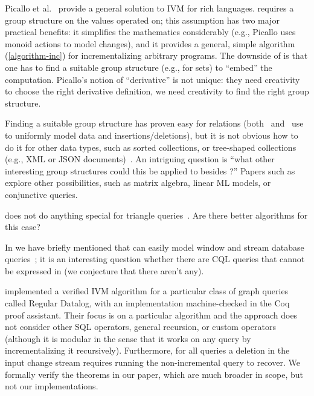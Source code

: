 Picallo et al.~\cite{picallo-scop19} provide a general solution to IVM for
rich languages.  \dbsp requires a group structure on the values operated on;
this assumption has two major practical benefits: it simplifies the mathematics considerably
(e.g., Picallo uses monoid actions to model changes), and it provides a general, simple
algorithm (\ref{algorithm-inc}) for incrementalizing arbitrary programs.  The downside of
\dbsp is that one has to find a suitable group structure (e.g., \zrs for sets) to ``embed''
the computation.  Picallo's notion of ``derivative'' is not unique: they need creativity to choose
the right derivative definition, we need creativity to find the right group structure.

Finding a suitable group structure has proven easy for relations (both~\cite{koch-pods10}
and~\cite{green-tcs11} use \zrs to uniformly model data and insertions/deletions), but it is
not obvious how to do it for other data types, such as sorted collections, or tree-shaped
collections (e.g., XML or JSON documents)~\cite{foster-planx08}.  An intriguing question
is ``what other interesting group structures could this be applied to besides \zrs?''
Papers such as~\cite{nikolic-icmd18} explore other possibilities, such as matrix algebra,
linear ML models, or conjunctive queries.

\dbsp does not do anything special for triangle queries~\cite{kara-tds20}.  Are there
better algorithms for this case?

In  we have briefly mentioned that \dbsp can easily
model window and stream database queries~\cite{arasu-tr02,aurora}; it is an
interesting question whether there are CQL queries that cannot be expressed in \dbsp
(we conjecture that there aren't any).

\cite{bonifati-iclp2018} implemented a verified IVM algorithm for a particular
class of graph queries called Regular Datalog, with an implementation machine-checked in the
Coq proof assistant. Their focus is on a particular algorithm and the approach does not
consider other SQL operators, general recursion, or custom operators (although it is modular
in the sense that it works on any query by incrementalizing it recursively). Furthermore,
for all queries a deletion in the input change stream requires running the non-incremental
query to recover.  We formally verify the theorems in our paper, which
are much broader in scope, but not our implementations.

